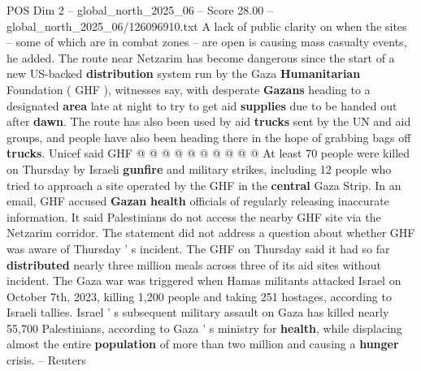 \begin{textsample}{POS Dim 2 – global\_north\_2025\_06 – Score 28.00 – global\_north\_2025\_06/126096910.txt}
A lack of public clarity on when the sites -- some of which are in combat zones -- are open is causing mass casualty events, he added.
The route near Netzarim has become dangerous since the start of a new US-backed \textbf{distribution} system run by the Gaza \textbf{Humanitarian} Foundation ( GHF ), witnesses say, with desperate \textbf{Gazans} heading to a designated \textbf{area} late at night to try to get aid \textbf{supplies} due to be handed out after \textbf{dawn}.
The route has also been used by aid \textbf{trucks} sent by the UN and aid groups, and people have also been heading there in the hope of grabbing bags off \textbf{trucks}.
Unicef said GHF @ @ @ @ @ @ @ @ @ @ At least 70 people were killed on Thursday by Israeli \textbf{gunfire} and military strikes, including 12 people who tried to approach a site operated by the GHF in the \textbf{central} Gaza Strip.
In an email, GHF accused \textbf{Gazan} \textbf{health} officials of regularly releasing inaccurate information.
It said Palestinians do not access the nearby GHF site via the Netzarim corridor.
The statement did not address a question about whether GHF was aware of Thursday ' s incident.
The GHF on Thursday said it had so far \textbf{distributed} nearly three million meals across three of its aid sites without incident.
The Gaza war was triggered when Hamas militants attacked Israel on October 7th, 2023, killing 1,200 people and taking 251 hostages, according to Israeli tallies.
Israel ' s subsequent military assault on Gaza has killed nearly 55,700 Palestinians, according to Gaza ' s ministry for \textbf{health}, while displacing almost the entire \textbf{population} of more than two million and causing a \textbf{hunger} crisis. -- Reuters

\end{textsample}
